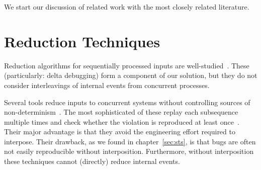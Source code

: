%



We start our discussion of related work with the most closely
related literature.

\section{Reduction Techniques}

 Reduction
algorithms for sequentially processed inputs are
well-studied~\cite{Zeller:2002:SIF:506201.506206,claessen2000quickcheck,regehr2012test,whitaker2004configuration,burger2011minimizing,fse_web_ddmin,chang2007simulation}.
These (particularly: delta debugging) form a component of our solution, but they do not consider
interleavings of internal events from concurrent processes.

 Several
tools reduce inputs to concurrent
systems without controlling sources of non-determinism~\cite{arts2006testing,clause2007technique,tucek2007triage,jin2013f3,hughes2011testing}.
The most sophisticated of these replay each subsequence
multiple times and check whether the violation is reproduced at least once~\cite{hughes2011testing,claessen2009finding}.
Their major advantage is that they avoid the engineering effort required to
interpose. Their drawback, as we found in chapter~\ref{sec:sts},
 is that bugs are often not easily reproducible without
interposition. Furthermore, without interposition these techniques cannot
(directly) reduce internal events.


